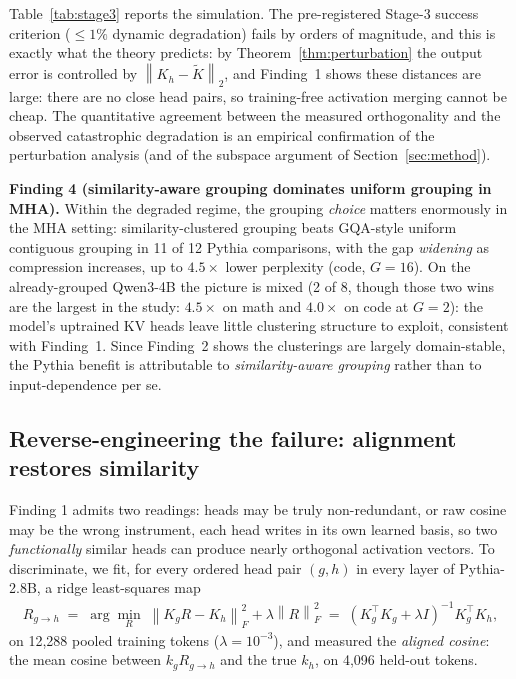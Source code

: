 \documentclass{article}
\newcommand{\norm}[1]{\left\lVert #1 \right\rVert}
\newcommand{\opnorm}[1]{\left\lVert #1 \right\rVert_{2}}
\begin{document}
Table~\ref{tab:stage3} reports the simulation. The pre-registered Stage-3
success criterion ($\le 1\%$ dynamic degradation) fails by orders of
magnitude, and this is exactly what the theory predicts: by
Theorem~\ref{thm:perturbation} the output error is controlled by
$\opnorm{K_h - \tilde K}$, and Finding~1 shows these distances are
large: there are no close head pairs, so training-free activation merging
cannot be cheap. The quantitative agreement between the measured
orthogonality and the observed catastrophic degradation is an empirical
confirmation of the perturbation analysis (and of the subspace argument of
Section~\ref{sec:method}).

\textbf{Finding 4 (similarity-aware grouping dominates uniform grouping in
MHA).} Within the degraded regime, the grouping \emph{choice} matters
enormously in the MHA setting: similarity-clustered grouping beats
GQA-style uniform contiguous grouping in 11 of 12 Pythia comparisons, with
the gap \emph{widening} as compression increases, up to $4.5\times$ lower
perplexity (code, $G{=}16$). On the already-grouped Qwen3-4B the picture is
mixed (2 of 8, though those two wins are the largest in the study:
$4.5\times$ on math and $4.0\times$ on code at $G{=}2$): the model's
uptrained KV heads leave little clustering structure to exploit, consistent
with Finding~1. Since Finding~2 shows the clusterings are largely
domain-stable, the Pythia benefit is attributable to
\emph{similarity-aware grouping} rather than to input-dependence per se.

\subsection{Reverse-engineering the failure: alignment restores similarity}
\label{sec:alignment}

Finding 1 admits two readings: heads may be truly non-redundant, or raw
cosine may be the wrong instrument, each head writes in its own learned
basis, so two \emph{functionally} similar heads can produce nearly
orthogonal activation vectors. To discriminate, we fit, for every ordered
head pair $(g,h)$ in every layer of Pythia-2.8B, a ridge least-squares map
\begin{align}
R_{g \to h} \;=\; \arg\min_{R} \; \norm{K_g R - K_h}_F^2 + \lambda \norm{R}_F^2
\;=\; (K_g^\top K_g + \lambda I)^{-1} K_g^\top K_h,
\end{align}
on 12{,}288 pooled training tokens ($\lambda = 10^{-3}$), and measured the
\emph{aligned cosine}: the mean cosine between $k_g R_{g\to h}$ and the
true $k_h$, on 4{,}096 held-out tokens.
\end{document}
